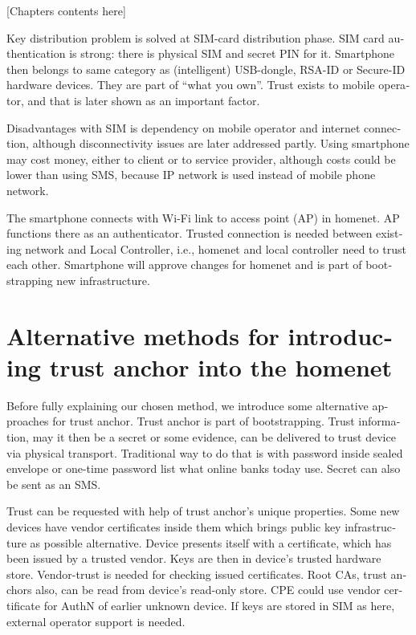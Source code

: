 \documentclass[12pt,a4paper,english]{tutthesis}
\begin{document}
\begin{otherlanguage}{english}
[Chapters contents here]

Key distribution problem is solved at SIM-card distribution phase.
SIM card authentication is strong: there is physical SIM and secret PIN for it.
Smartphone then belongs to same category as (intelligent) USB-dongle,
RSA-ID or Secure-ID hardware devices.  They are part of ``what you own''.
Trust exists to mobile operator, and that is later shown as an
important factor. 



Disadvantages with SIM is dependency on mobile operator and internet
connection, although disconnectivity issues are later addressed partly.
Using smartphone may cost money, either to client or to service
provider, although costs could be lower than using SMS, because 
IP network is used instead of mobile
phone network.


The smartphone connects
 with Wi-Fi link to access point (AP) in homenet.
 AP functions there as an authenticator.
Trusted connection is needed between existing network and Local
Controller, i.e.,   homenet and local controller need to trust each other.
Smartphone will approve changes for homenet and is part of bootstrapping
new infrastructure.

\section{Alternative methods for introducing trust anchor into the homenet}
\label{sec-4-1}

Before fully explaining our chosen method, we introduce some
alternative approaches for trust anchor. Trust anchor is part of
bootstrapping. Trust information, may it then be a secret or some
evidence, can be delivered to trust device via physical
transport. Traditional way to do that is with password inside sealed
envelope or one-time password list what online banks today use. Secret
can also be sent as an SMS.

Trust can be requested with help of trust anchor's unique
 properties. Some new devices have vendor certificates inside them which
brings public key infrastructure as possible alternative. Device
presents itself with a certificate, which has been issued by a trusted
vendor.  Keys are then in device's trusted hardware store.
Vendor-trust is needed for checking issued certificates. Root CAs, 
trust anchors also, can be read from device's read-only store. 
CPE could use vendor certificate for AuthN of earlier unknown device.
If keys are stored in SIM as here, external operator support is needed. 



\end{otherlanguage}
\end{document}
